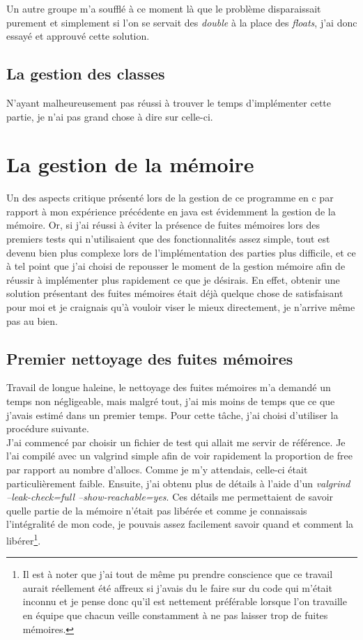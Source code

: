 \documentclass[12pt]{article}
\begin{document}
Un autre groupe m'a soufflé à ce moment là que le problème disparaissait
purement et simplement si l'on se servait des {\em double} à la place des
{\em floats}, j'ai donc essayé et approuvé cette solution.

\subsection{La gestion des classes}
N'ayant malheureusement pas réussi à trouver le temps d'implémenter cette
partie, je n'ai pas grand chose à dire sur celle-ci.

\section{La gestion de la mémoire}
Un des aspects critique présenté lors de la gestion de ce programme en c par
rapport à mon expérience précédente en java est évidemment la gestion de
la mémoire. Or, si j'ai réussi à éviter la présence de fuites mémoires lors
des premiers tests qui n'utilisaient que des fonctionnalités assez simple,
tout est devenu bien plus complexe lors de l'implémentation des parties plus
difficile, et ce à tel point que j'ai choisi de repousser le moment de la
gestion mémoire afin de réussir à implémenter plus rapidement ce que je
désirais. En effet, obtenir une solution présentant des fuites mémoires était
déjà quelque chose de satisfaisant pour moi et je craignais qu'à vouloir
viser le mieux directement, je n'arrive même pas au bien.

\subsection{Premier nettoyage des fuites mémoires}
Travail de longue haleine, le nettoyage des fuites mémoires m'a demandé un
temps non négligeable, mais malgré tout, j'ai mis moins de temps que ce que
j'avais estimé dans un premier temps. Pour cette tâche, j'ai choisi d'utiliser
la procédure suivante.\\

J'ai commencé par choisir un fichier de test qui allait me servir de
référence. Je l'ai compilé avec un valgrind simple afin de voir rapidement la
proportion de free par rapport au nombre d'allocs. Comme je m'y attendais,
celle-ci était particulièrement faible. Ensuite, j'ai obtenu plus de détails
à l'aide d'un {\em valgrind --leak-check=full --show-reachable=yes}. Ces
détails me permettaient de savoir quelle partie de la mémoire n'était pas
libérée et comme je connaissais l'intégralité de mon code, je pouvais assez
facilement savoir quand et comment la libérer\footnote{Il est à noter que
j'ai tout de même pu prendre conscience que ce travail aurait réellement été
affreux si j'avais du le faire sur du code qui m'était inconnu et je pense
donc qu'il est nettement préférable lorsque l'on travaille en équipe que
chacun veille constamment à ne pas laisser trop de fuites mémoires.}.\\
\end{document}
